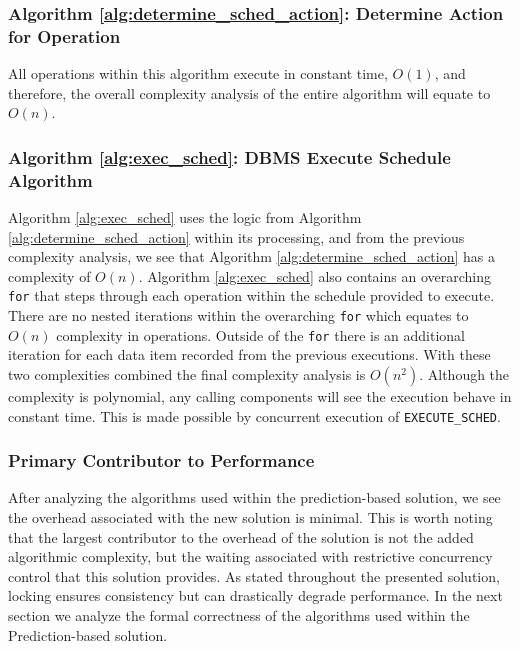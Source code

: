 \subsubsection{Algorithm \ref{alg:determine_sched_action}: Determine Action for Operation}
\label{alg_complexity:get_action}
All operations within this algorithm execute in constant time, $O(1)$, and therefore, the overall complexity analysis of the entire algorithm will equate to $O(n)$.

\subsubsection{Algorithm \ref{alg:exec_sched}: DBMS Execute Schedule Algorithm}
\label{alg_complexity:exec_sched}
Algorithm \ref{alg:exec_sched} uses the logic from Algorithm \ref{alg:determine_sched_action} within its processing, and from the previous complexity analysis, we see that Algorithm \ref{alg:determine_sched_action} has a complexity of $O(n)$. Algorithm \ref{alg:exec_sched} also contains an overarching \verb|for| that steps through each operation within the schedule provided to execute. There are no nested iterations within the overarching \verb|for| which equates to $O(n)$ complexity in operations. Outside of the \verb|for| there is an additional iteration for each data item recorded from the previous executions. With these two complexities combined the final complexity analysis is $O(n^2)$. Although the complexity is polynomial, any calling components will see the execution behave in constant time. This is made possible by concurrent execution of \verb|EXECUTE_SCHED|. 

\subsubsection{Primary Contributor to Performance}
\label{alg_complexity:primary_contributor}
After analyzing the algorithms used within the prediction-based solution, we see the overhead associated with the new solution is minimal. This is worth noting that the largest contributor to the overhead of the solution is not the added algorithmic complexity, but the waiting associated with restrictive concurrency control that this solution provides. As stated throughout the presented solution, locking ensures consistency but can drastically degrade performance. In the next section we analyze the formal correctness of the algorithms used within the Prediction-based solution. 